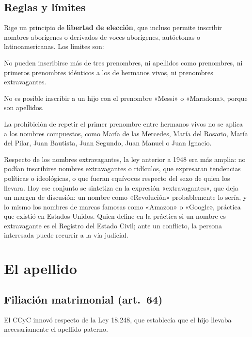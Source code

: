 \documentclass[12pt,oneside]{book}
\begin{document}
\subsection{Reglas y límites}

Rige un principio de \textbf{libertad de elección}, que incluso permite inscribir nombres aborígenes o derivados de voces aborígenes, autóctonas o latinoamericanas. Los límites son:

\begin{importante}
No pueden inscribirse más de tres prenombres, ni apellidos como prenombres, ni primeros prenombres idénticos a los de hermanos vivos, ni prenombres extravagantes.
\end{importante}

\begin{ejemplo}
No es posible inscribir a un hijo con el prenombre «Messi» o «Maradona», porque son apellidos.
\end{ejemplo}

La prohibición de repetir el primer prenombre entre hermanos vivos no se aplica a los nombres compuestos, como María de las Mercedes, María del Rosario, María del Pilar, Juan Bautista, Juan Segundo, Juan Manuel o Juan Ignacio.

Respecto de los nombres extravagantes, la ley anterior a 1948 era más amplia: no podían inscribirse nombres extravagantes o ridículos, que expresaran tendencias políticas o ideológicas, o que fueran equívocos respecto del sexo de quien los llevara. Hoy ese conjunto se sintetiza en la expresión «extravagantes», que deja un margen de discusión: un nombre como «Revolución» probablemente lo sería, y lo mismo los nombres de marcas famosas como «Amazon» o «Google», práctica que existió en Estados Unidos. Quien define en la práctica si un nombre es extravagante es el Registro del Estado Civil; ante un conflicto, la persona interesada puede recurrir a la vía judicial.

\section{El apellido}

\subsection{Filiación matrimonial (art.~64)}

El CCyC innovó respecto de la Ley 18.248, que establecía que el hijo llevaba necesariamente el apellido paterno.
\end{document}
